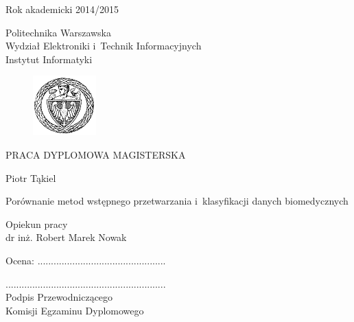 \documentclass[../thesis.tex]{subfiles}
\begin{document}
\begin{titlepage} 

\hfill Rok akademicki 2014/2015 \\           	
\begin{flushleft}
\hspace*{18mm} Politechnika Warszawska \\
Wydział Elektroniki i~Technik Informacyjnych \\
\hspace*{22mm} Instytut Informatyki \\
\end{flushleft}
\vspace{1.0cm}

\begin{figure}[h]
\centering
\includegraphics{logo_pw2.png}
\end{figure}
\vspace{1cm}

\begin{center}
\fontsize{16pt}{18pt}\selectfont
PRACA DYPLOMOWA MAGISTERSKA
\vspace{1.0cm}

\fontsize{14pt}{18pt}\selectfont
Piotr Tąkiel
\vspace{1.0cm}

\fontsize{20pt}{24pt}\selectfont
Porównanie metod wstępnego przetwarzania i~klasyfikacji danych biomedycznych
\end{center}
\vspace{3cm}

\hspace*{112mm}Opiekun pracy \\
\hspace*{110mm}dr inż. Robert Marek Nowak \\
\vspace{2.5cm}

\begin{flushleft}
Ocena: ................................................ \\

\vspace{5mm}

............................................................ \\

\hspace*{10mm}Podpis Przewodniczącego \\
\hspace*{3mm}Komisji Egzaminu Dyplomowego
\end{flushleft}

\end{titlepage} 
\pagestyle{empty}
\cleardoublepage 
\end{document}
